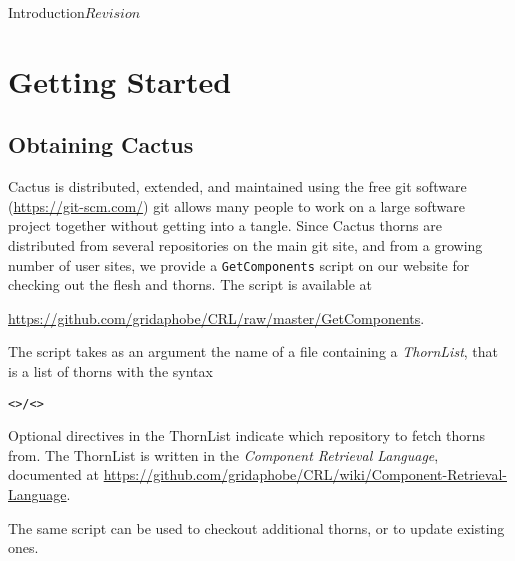 
\begin{cactuspart}{Introduction}{}{$Revision$}\label{part:Introduction}
\renewcommand{\thepage}{\Alph{part}\arabic{page}}


\chapter{Getting Started}
\label{cha:gs}


\section{Obtaining Cactus}
\label{sec:checkout}

Cactus is distributed, extended, and maintained using the free git
software (\url{https://git-scm.com/})
git allows many people to work on a large software project
together without getting into a tangle.
Since Cactus thorns are distributed from several repositories on the
main git site, and from a growing number of user sites, we provide a
\texttt{GetComponents} script on our website for checking out the flesh 
and thorns. The script is available at

\url{https://github.com/gridaphobe/CRL/raw/master/GetComponents}.

The
script takes as an argument the name of a file containing a \textit{ThornList},
that is a list of thorns with the syntax
\begin{alltt}
<>/<>
\end{alltt}

Optional directives in the ThornList indicate which repository to
fetch thorns from. The ThornList is written in the {\em Component
  Retrieval Language}, documented at
\url{https://github.com/gridaphobe/CRL/wiki/Component-Retrieval-Language}.

The same script can be used to checkout additional thorns, or to update 
existing ones.


\end{cactuspart}
